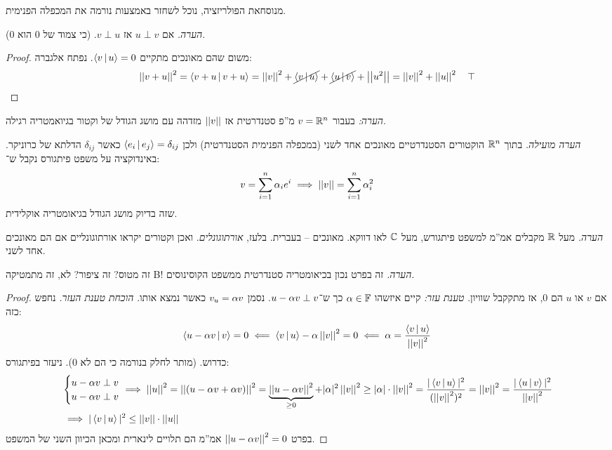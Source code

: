 \documentclass[]{../../../../tex/classes/styledArticle}
\begin{document}
    מנוסחאת הפולריזציה, נוכל לשחזר באמצעות נורמה את המכפלה הפנימית. 
    
    
    \textit{הערה. }אם $u \perp v$ אז $v \perp u$. (כי צמוד של $0$ הוא $0$). 
    
    \begin{proof} משום שהם מאונכים מתקיים $\mut{v}{u} = 0$. נפתח אלגברה: 
        \[ \norm{v + u}^2 = \mut{v + u}{v + u} = \norm{v}^2 + \cancel{\mut{v}{u}} + \cancel{\mut{u}{v}} + \norm{u^2} = \norm{v}^2 + \norm{u}^2 \quad \top \]
    \end{proof}
    
    \textit{הערה: }בעבור $v = \R^n$ מ''פ סטנדרטית אז $\norm{v}$ מזדהה עם מושג הגודל של וקטור בגיואמטריה רגילה. 
    
    \textit{הערה מועילה. }בתוך $\R^n$ הוקטורים הסטנדרטיים מאונכים אחד לשני (במכפלה הפנימית הסטנדרטית) ולכן $\mut{e_i}{e_j} = \delta_{ij}$ כאשר $\delta_{ij}$ הדלתא של כרוניקר. באינדוקציה על משפט פיתגורס נקבל ש־: 
    \[ v = \sum_{i = 1}^{n}\ag_i e^i \implies \norm{v} = \sum_{i = 1}^{n}\ag_i^2 \]
    שזה בדיוק מושג הגודל בגיאומטריה אוקלידית. 
    
   \textit{הערה. }מעל $\R$ מקבלים אמ''מ למשפט פיתגורש, מעל $\C$ לאו דווקא. מאונכים – בעברית. בלעז, \textit{אורתוגונלים}. ואכן וקטורים יקראו אורתוגונליים אם הם מאונכים אחד לשני. 
   
   זה מטוס? זה ציפור? לא, זה מתמטיקה B!
   \textit{הערה. }זה בפרט נכון בכיאומטריה סטנדרטית ממשפט הקוסינוסים. 
   
   \begin{proof}
       אם $v$ או $u$ הם $0$, אז מתקקבל שוויון. 
       \textit{טענת עזר: }קיים איזשהו $\ag \in \F$ כך ש־$u - \ag v \perp v$. נסמן $v_u = \ag v$ כאשר נמצא אותו. 
       \textit{הוכחת טענת העזר. }נחפש כזה: 
       \[ \mut{u - \ag v}{v} = 0 \impliedby \mut{v}{u} - \ag \norm{v}^2 = 0 \impliedby \ag = \frac{\mut{v}{u}}{\norm{v}^2} \]
       כדרוש. (מותר לחלק בנורמה כי הם לא $0$). ניעזר בפיתגורס: 
       \begin{align*}
           &\begin{cases}
               u - \ag v \perp v \\ u - \ag v \perp v
           \end{cases}\dequad \implies \norm{u}^2 = \norm{(u - \ag v + \ag v)}^2 = \underbrace{\norm{u - \ag v}^2}_{\ge 0} + |\ag|^2\norm{v}^2 \ge |\ag|\cdot\norm{v}^2 = \frac{|\mut{v}{u}|^2}{(\norm{v}^2)^2} = \norm{v}^2 = \frac{|\mut{u}{v}|^2}{\norm{v}^2} \\ &\implies |\mut{v}{u}|^2 \le \norm{v} \cdot \norm{u}
       \end{align*}
       בפרט $\norm{u - \ag v}^2 = 0$ אמ''מ הם תלויים לינארית ומכאן הכיוון השני של המשפט. 
   \end{proof}
   
\end{document}

